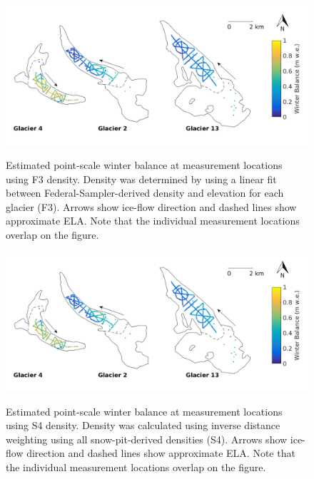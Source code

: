 \documentclass{sfuthesis}
\begin{document}
{\begin{figure}[H]
	\centering
	\includegraphics[width = \textwidth]{SWEmap_opt7.png}\\
	\caption[Estimated point-scale winter balance at measurement locations using F3 density]{Estimated point-scale winter balance at measurement locations using F3 density. Density was determined by using a linear fit between Federal-Sampler-derived density and elevation for each glacier (F3). Arrows show ice-flow direction and dashed lines show approximate ELA. Note that the individual measurement locations overlap on the figure.}
	\label{fig:SWEmap_F3}
\end{figure}

\begin{figure}[H]
	\centering
	\includegraphics[width = \textwidth]{SWEmap_opt8.png}\\
	\caption[Estimated point-scale winter balance at measurement locations using S4 density]{Estimated point-scale winter balance at measurement locations using S4 density. Density was calculated using inverse distance weighting using all snow-pit-derived densities (S4). Arrows show ice-flow direction and dashed lines show approximate ELA. Note that the individual measurement locations overlap on the figure.}
	\label{fig:SWEmap_S4}
\end{figure}

}
\end{document}
